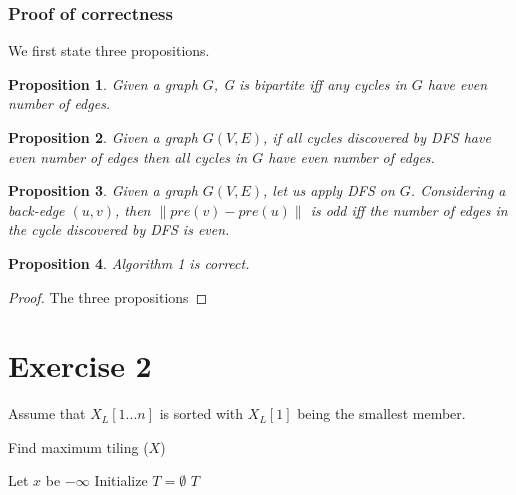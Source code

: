 \documentclass[a4paper,10pt,twoside]{article}
\DeclareMathOperator*{\argmax}{arg\,max}
\newtheorem{proof}{Proof}
\newtheorem{proposition}{Proposition}
\begin{document}
\subsubsection*{Proof of correctness}
We first state three propositions.
\begin{proposition}
	Given a graph $G$, G is bipartite iff any cycles in $G$ have even number of
	edges.
\end{proposition}

\begin{proposition} 
	Given a graph $G(V, E)$, if all cycles discovered by DFS
	have even number of edges then all cycles in $G$ have even number of edges.
\end{proposition}

\begin{proposition}
	Given a graph $G(V, E)$, let us apply DFS on $G$. Considering a back-edge $(u, v)$, then
	$\|pre(v) - pre(u)\|$ is odd iff the number of edges in the cycle discovered by DFS is even. 
\end{proposition}

\begin{proposition}
	Algorithm 1 is correct.
\end{proposition}

\begin{proof}
	The three propositions 
\end{proof}



\section*{Exercise 2}

Assume that $X_L[1...n]$ is sorted with $X_L[1]$ being the smallest member.

\begin{algorithm}[h]
\caption{Find maximum tiling ($X$)}
	Let $x$ be $-\infty$ \;
	Initialize $T = \emptyset$\;
	\Return $T$\;
\end{algorithm}
\end{document}
